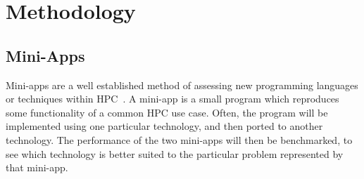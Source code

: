 \documentclass[12pt,a4paper]{report}
\begin{document}



\chapter{Methodology}
\section{Mini-Apps}
Mini-apps are a well established method of assessing new programming languages or techniques within HPC~\cite{Mallinson:2014, Slaughter:2015, martineau2017arch}. A mini-app is a small program which reproduces some functionality of a common HPC use case. Often, the program will be implemented using one particular technology, and then ported to another technology. The performance of the two mini-apps will then be benchmarked, to see which technology is better suited to the particular problem represented by that mini-app.
\end{document}
